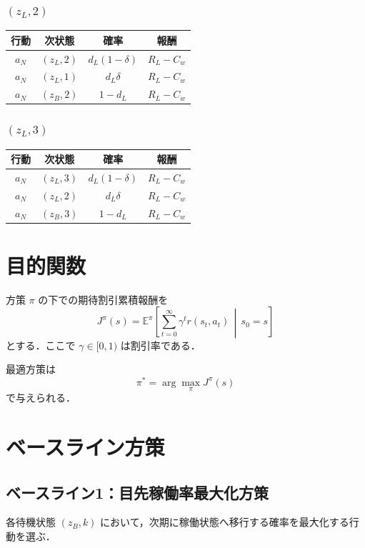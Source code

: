 \documentclass[11pt,a4paper]{bxjsarticle}
\begin{document}
\subsubsection*{\((z_L,2)\)}
\begin{table}[H]
\centering
\begin{tabular}{cccc}
\toprule
行動 & 次状態 & 確率 & 報酬 \\
\midrule
\(a_N\) & \((z_L,2)\) & \(d_L(1-\delta)\) & \(R_L-C_w\) \\
\(a_N\) & \((z_L,1)\) & \(d_L\delta\) & \(R_L-C_w\) \\
\(a_N\) & \((z_B,2)\) & \(1-d_L\) & \(R_L-C_w\) \\
\bottomrule
\end{tabular}
\end{table}

\subsubsection*{\((z_L,3)\)}
\begin{table}[H]
\centering
\begin{tabular}{cccc}
\toprule
行動 & 次状態 & 確率 & 報酬 \\
\midrule
\(a_N\) & \((z_L,3)\) & \(d_L(1-\delta)\) & \(R_L-C_w\) \\
\(a_N\) & \((z_L,2)\) & \(d_L\delta\) & \(R_L-C_w\) \\
\(a_N\) & \((z_B,3)\) & \(1-d_L\) & \(R_L-C_w\) \\
\bottomrule
\end{tabular}
\end{table}

\section{目的関数}

方策 \(\pi\) の下での期待割引累積報酬を
\[
    J^\pi(s)
    =
    \mathbb{E}^{\pi}\left[
        \sum_{t=0}^{\infty}\gamma^t r(s_t,a_t)
        \,\middle|\,
        s_0=s
    \right]
\]
とする．ここで \(\gamma\in[0,1)\) は割引率である．

最適方策は
\[
    \pi^*=\arg\max_\pi J^\pi(s)
\]
で与えられる．

\section{ベースライン方策}

\subsection{ベースライン1：目先稼働率最大化方策}
各待機状態 \((z_B,k)\) において，次期に稼働状態へ移行する確率を最大化する行動を選ぶ．
\end{document}
